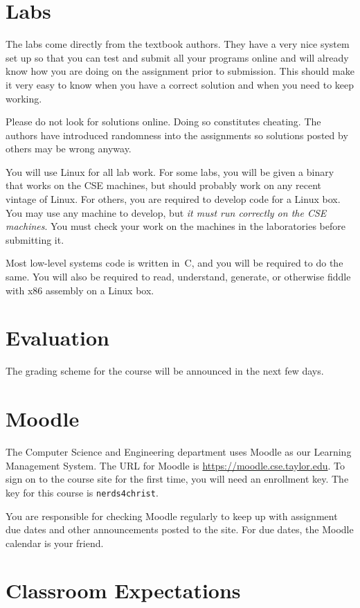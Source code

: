 \documentclass{article}
\begin{document}
\section{Labs}
\label{sec:orgheadline7}

The labs come directly from the textbook authors. They have a very nice system set up so
that you can test and submit all your programs online and will already know how you are
doing on the assignment prior to submission. This should make it very easy to know when
you have a correct solution and when you need to keep working.

Please do not look for solutions online. Doing so constitutes cheating.  The authors have
introduced randomness into the assignments so solutions posted by others may be wrong
anyway.

You will use Linux for all lab work. For some labs, you will be given a binary that works
on the CSE machines, but should probably work on any recent vintage of Linux. For others,
you are required to develop code for a Linux box. You may use any machine to develop, but
\emph{it must run correctly on the CSE machines}. You must check your work on the machines in the
laboratories before submitting it.

Most low-level systems code is written in~C, and you will be required to do the same. You
will also be required to read, understand, generate, or otherwise fiddle with x86 assembly
on a Linux box.

\section{Evaluation}
\label{sec:orgheadline8}
The grading scheme for the course will be announced in the next few days.

\section{Moodle}
\label{sec:orgheadline9}

The Computer Science and Engineering department uses Moodle as our Learning Management
System. The URL for Moodle is \url{https://moodle.cse.taylor.edu}. To sign on to the course site
for the first time, you will need an enrollment key. The key for this course is
\texttt{nerds4christ}.

You are responsible for checking Moodle regularly to keep up with assignment due dates and
other announcements posted to the site. For due dates, the Moodle calendar is your friend.
\section{Classroom Expectations}
\label{sec:orgheadline13}
\end{document}
